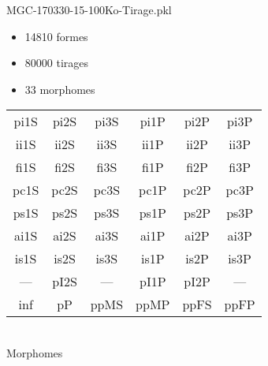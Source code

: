 MGC-170330-15-100Ko-Tirage.pkl
\begin{itemize}
\item 14810 formes
\item 80000 tirages
\item 33 morphomes
\end{itemize}
\begin{center}
\begin{tabular}{cccccc}
\hline
\cellcolor{white}pi1S & \cellcolor{orange}pi2S & \cellcolor{orange}pi3S & \cellcolor{white}pi1P & \cellcolor{white}pi2P & \cellcolor{white}pi3P\\
\cellcolor{brown}ii1S & \cellcolor{brown}ii2S & \cellcolor{brown}ii3S & \cellcolor{white}ii1P & \cellcolor{white}ii2P & \cellcolor{brown}ii3P\\
\cellcolor{yellow}fi1S & \cellcolor{lime}fi2S & \cellcolor{lime}fi3S & \cellcolor{green}fi1P & \cellcolor{white}fi2P & \cellcolor{green}fi3P\\
\cellcolor{yellow}pc1S & \cellcolor{yellow}pc2S & \cellcolor{yellow}pc3S & \cellcolor{white}pc1P & \cellcolor{white}pc2P & \cellcolor{yellow}pc3P\\
\cellcolor{teal}ps1S & \cellcolor{teal}ps2S & \cellcolor{teal}ps3S & \cellcolor{white}ps1P & \cellcolor{white}ps2P & \cellcolor{teal}ps3P\\
\cellcolor{white}ai1S & \cellcolor{lightgray}ai2S & \cellcolor{lightgray}ai3S & \cellcolor{white}ai1P & \cellcolor{blue}ai2P & \cellcolor{white}ai3P\\
\cellcolor{pink}is1S & \cellcolor{white}is2S & \cellcolor{lightgray}is3S & \cellcolor{white}is1P & \cellcolor{black}is2P & \cellcolor{pink}is3P\\
--- & \cellcolor{white}pI2S & --- & \cellcolor{white}pI1P & \cellcolor{blue}pI2P & ---\\
\cellcolor{white}inf & \cellcolor{white}pP & \cellcolor{white}ppMS & \cellcolor{white}ppMP & \cellcolor{white}ppFS & \cellcolor{white}ppFP\\
\hline
\end{tabular}\\
Morphomes
\end{center}
\bigskip

